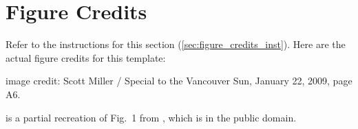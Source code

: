 \documentclass[review]{vgtc}                 %
\begin{document}
\section*{Figure Credits}
\label{sec:figure_credits}

Refer to the instructions for this section (\cref{sec:figure_credits_inst}).
Here are the actual figure credits for this template:

 image credit: Scott Miller / Special to the Vancouver Sun, January 22, 2009, page A6.

 is a partial recreation of Fig.\ 1 from \cite{Isenberg:2017:VMC}, which is in the public domain.


%

%
%
%


\end{document}
